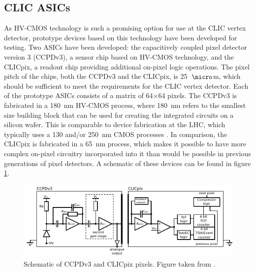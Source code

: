 
\subsection{CLIC ASICs}
As HV-CMOS technology is such a promising option for use at the CLIC vertex detector, prototype devices based on this technology have been developed for testing.  Two ASICs have been developed: the capacitively coupled pixel detector version 3 (CCPDv3), a sensor chip based on HV-CMOS technology, and the CLICpix, a readout chip providing additional on-pixel logic operations.  The pixel pitch of the chips, both the CCPDv3 and the CLICpix, is 25~${\micro}$m, which should be sufficient to meet the requirements for the CLIC vertex detector.  Each of the prototype ASICs consists of a matrix of 64$\times$64 pixels.  The CCPDv3 is fabricated in a 180~nm HV-CMOS process, where 180~nm refers to the smallest size building block that can be used for creating the integrated circuits on a silicon wafer.  This is comparable to device fabrication at the LHC, which typically uses a 130 and/or 250~nm CMOS processes \cite{Aaij:2244311, Dominguez:1481838}.  In comparison, the CLICpix is fabricated in a 65~nm process, which makes it possible to have more complex on-pixel circuitry incorporated into it than would be possible in previous generations of pixel detectors.  A schematic of these devices can be found in figure \ref{fig:ccpdandclicpix}.  

\begin{figure}[h!]
\centering
\includegraphics[width=1.0\textwidth]{CLICdpVertex/Plots/schematic.pdf}
\caption[Schematic of CCPDv3 and CLICpix pixels. Figure taken from \cite{FabricationNote}.]{Schematic of CCPDv3 and CLICpix pixels. Figure taken from \cite{FabricationNote}.}
\label{fig:ccpdandclicpix}
\end{figure}


